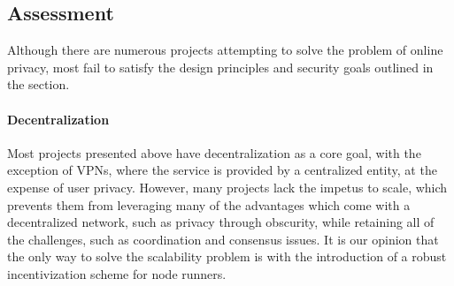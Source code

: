 \subsection{Assessment}

Although there are numerous projects attempting to solve the problem of online privacy, most fail to satisfy the design principles and security goals outlined in the  section.

\paragraph{Decentralization} Most projects presented above have decentralization as a core goal, with the exception of VPNs, where the service is provided by a centralized entity, at the expense of user privacy. However, many projects lack the impetus to scale, which prevents them from leveraging many of the advantages which come with a decentralized network, such as privacy through obscurity, while retaining all of the challenges, such as coordination and consensus issues. It is our opinion that the only way to solve the scalability problem is with the introduction of a robust incentivization scheme for node runners.

